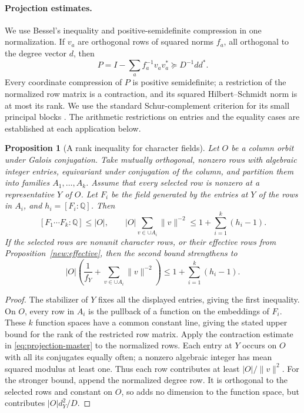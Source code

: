 \documentclass[11pt]{amsart}
\numberwithin{equation}{section}
\newtheorem{proposition}[theorem]{Proposition}
\theoremstyle{definition}
\theoremstyle{plain}
\newcommand{\QQ}{\mathbb Q}
\begin{document}
\paragraph{Projection estimates.}\label{lin:projection}
We use Bessel's inequality and positive-semidefinite compression in
one normalization. If $v_a$ are orthogonal rows of squared norms
$f_a$, all orthogonal to the degree vector $d$, then
\begin{equation}\label{eq:projection-master}
 P=I-\sum_a f_a^{-1}v_av_a^*\succeq D^{-1}dd^*.
\end{equation}
Every coordinate compression of $P$ is positive semidefinite; a
restriction of the normalized row matrix is a contraction, and its
squared Hilbert--Schmidt norm is at most its rank. We use the
standard Schur-complement criterion for its small principal blocks
\cite[\S7.7]{HornJohnson}. The arithmetic restrictions on entries
and the equality cases are established at each application below.

\begin{proposition}[A rank inequality for character fields]\label{r5:field-rank}
Let $O$ be a column orbit under Galois conjugation. Take mutually
orthogonal, nonzero rows with algebraic integer entries, equivariant
under conjugation of the column, and partition them into families
$A_1,\ldots,A_k$. Assume that every selected row is nonzero at a
representative $Y$ of $O$. Let $F_i$ be the field generated by the
entries at $Y$ of the rows in $A_i$, and $h_i=[F_i:\QQ]$. Then
\[
 [F_1\cdots F_k:\QQ]\le |O|,\qquad
 |O|\sum_{v\in\cup A_i}\|v\|^{-2}\le 1+\sum_{i=1}^k(h_i-1).
\]
If the selected rows are nonunit character rows, or their effective
rows from Proposition~\ref{new:effective}, then the second bound
strengthens to
\[
 |O|\left(\frac1{f_Y}+\sum_{v\in\cup A_i}\|v\|^{-2}\right)
 \le 1+\sum_{i=1}^k(h_i-1).
\]
\end{proposition}
\begin{proof}
The stabilizer of $Y$ fixes all the displayed entries, giving the
first inequality. On $O$, every row in $A_i$ is the pullback of a
function on the embeddings of $F_i$. These $k$ function spaces have
a common constant line, giving the stated upper bound for the rank of
the restricted row matrix. Apply the contraction estimate in
\eqref{eq:projection-master} to the normalized rows. Each entry at $Y$ occurs on $O$ with all its conjugates
equally often; a nonzero algebraic integer has mean squared modulus
at least one. Thus each row contributes at least $|O|/\|v\|^2$.
For the stronger bound, append the normalized degree row. It is
orthogonal to the selected rows and constant on $O$, so adds no
dimension to the function space, but contributes $|O|d_Y^2/D$.
\end{proof}
\end{document}
